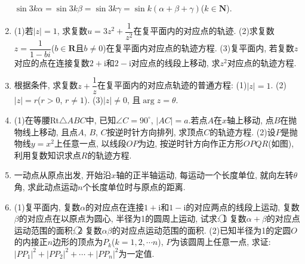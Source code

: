 \documentclass[10pt,a4paper]{article}
\begin{document}
\begin{enumerate}[1.]
$\sin 3k\alpha =\sin 3k\beta =\sin 3k\gamma =\sin k(\alpha +\beta +\gamma)$($k\in \mathbf{N}$).
\item (1)若$|z|=1$, 求复数$u=3z^2+\dfrac 1{z^2}$在复平面内的对应点的轨迹.
(2)求复数$z=\dfrac 1{1-bi}$($b\in \mathbf{R}$且$b\ne 0$)在复平面内对应点的轨迹方程.
(3)复平面内, 若复数$z$对应的点在连接复数$2+\mathrm{i}$和$2-\mathrm{i}$对应点的线段上移动, 求$z^2$对应点的轨迹方程.
\item 根据条件, 求复数$z+\dfrac 1z$在复平面内的对应点轨迹的普通方程:
(1)$|z|=1$.
(2)$|z|=r$($r>0$, $r\ne 1$).
(3)$|z|\ne 0$, 且$\arg z=\theta$.
\item (1)在等腰Rt$\triangle ABC$中, 已知$\angle C=90^{\circ }$, $|AC|=a$.若点$A$在$x$轴上移动, 点$B$在抛物线上移动, 且点$A$, $B$, $C$按逆时针方向排列, 求顶点$C$的轨迹方程.
(2)设$P$是抛物线$y=x^2$上任意一点, 以线段$OP$为边, 按逆时针方向作正方形$OPQR$(如图), 利用复数知识求点$R$的轨迹方程.
\begin{center}
\end{center}
\item 一动点从原点出发, 开始沿$x$轴的正半轴运动, 每运动一个长度单位, 就向左转$\theta$角, 求此动点运动$n$个长度单位时与原点的距离.
\item (1)复平面内, 复数$\alpha$的对应点在连接$1+\mathrm{i}$和$1-\mathrm{i}$的对应两点的线段上运动, 复数$\beta$的对应点在以原点为圆心, 半径为1的圆周上运动, 试求:
\textcircled{1} 复数$\alpha +\beta$的对应点运动范围的面积; 		\textcircled{2} 复数$\alpha \beta$的对应点运动范围的面积.
(2)已知半径为1的定圆$O$的内接正$n$边形的顶点为$P_k$($k=1,2,\cdots n$), $P$为该圆周上任意一点, 求证: $|PP_1|^2+|PP_2|^2+\cdots +|PP_n|^2$为一定值.


\end{enumerate}
\end{document}
